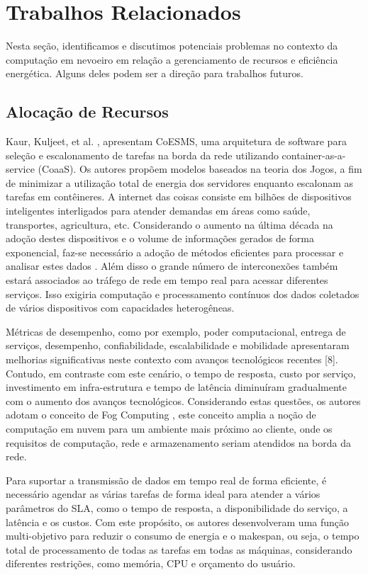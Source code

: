 \chapter{Trabalhos Relacionados}

Nesta seção, identificamos e discutimos potenciais problemas no contexto da computação em nevoeiro em relação a gerenciamento de recursos e eficiência energética. Alguns deles podem ser a direção para trabalhos futuros. 

\section{Alocação de Recursos}

Kaur, Kuljeet, et al. \cite{kaur2017container}, apresentam CoESMS, uma arquitetura de software para seleção e escalonamento de tarefas na borda da rede utilizando container-as-a-service (CoaaS). Os autores propõem modelos baseados na teoria dos Jogos, a fim de minimizar a utilização total de energia dos servidores enquanto escalonam as tarefas em contêineres. A internet das coisas consiste em bilhões de dispositivos inteligentes interligados para atender demandas em áreas como saúde, transportes, agricultura, etc. Considerando o aumento na última década na adoção destes dispositivos e o volume de informações gerados de forma exponencial, faz-se necessário a adoção de métodos eficientes para processar e analisar estes dados \cite{evans2011internet}. Além disso o grande número de interconexões também estará associados ao tráfego de rede em tempo real para acessar diferentes serviços. Isso exigiria computação e processamento contínuos dos dados coletados de vários dispositivos com capacidades heterogêneas.

Métricas de desempenho, como por exemplo, poder computacional, entrega de serviços, desempenho, confiabilidade, escalabilidade e mobilidade apresentaram melhorias significativas neste contexto com avanços tecnológicos recentes [8]. Contudo, em contraste com este cenário, o tempo de resposta, custo por serviço, investimento em infra-estrutura e tempo de latência diminuíram gradualmente com o aumento dos avanços tecnológicos. Considerando estas questões, os autores adotam o conceito de Fog Computing \cite{computing2006architectural}, este conceito amplia a noção de computação em nuvem para um ambiente mais próximo ao cliente, onde os requisitos de computação, rede e armazenamento seriam atendidos na borda da rede.

Para suportar a transmissão de dados em tempo real de forma eficiente, é necessário agendar as várias tarefas de forma ideal para atender a vários parâmetros do SLA, como o tempo de resposta, a disponibilidade do serviço, a latência e os custos. Com este propósito, os autores desenvolveram uma função multi-objetivo para reduzir o consumo de energia e o makespan, ou  seja, o tempo total de processamento de todas as tarefas em todas as máquinas, considerando diferentes restrições, como memória, CPU e orçamento do usuário. 

